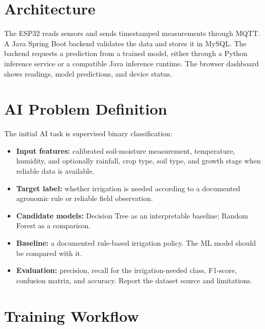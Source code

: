 \documentclass[12pt,a4paper]{report}
\begin{document}
\section{Architecture}

The ESP32 reads sensors and sends timestamped measurements through MQTT. A Java Spring Boot backend validates the data and stores it in MySQL. The backend requests a prediction from a trained model, either through a Python inference service or a compatible Java inference runtime. The browser dashboard shows readings, model predictions, and device status.

\section{AI Problem Definition}

The initial AI task is supervised binary classification:

\begin{itemize}[leftmargin=*]

\item \textbf{Input features:} calibrated soil-moisture measurement, temperature, humidity, and optionally rainfall, crop type, soil type, and growth stage when reliable data is available.

\item \textbf{Target label:} whether irrigation is needed according to a documented agronomic rule or reliable field observation.

\item \textbf{Candidate models:} Decision Tree as an interpretable baseline; Random Forest as a comparison.

\item \textbf{Baseline:} a documented rule-based irrigation policy. The ML model should be compared with it.

\item \textbf{Evaluation:} precision, recall for the irrigation-needed class, F1-score, confusion matrix, and accuracy. Report the dataset source and limitations.

\end{itemize}

\section{Training Workflow}
\end{document}
